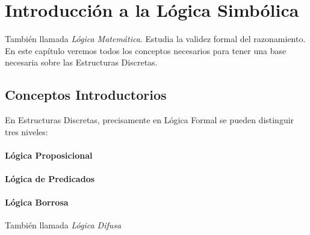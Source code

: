 \chapter{Introducción a la Lógica Simbólica}
También llamada \textit{Lógica Matemática}. Estudia la validez formal del razonamiento. En este capítulo veremos todos los conceptos necesarios para tener una base necesaria sobre las Estructuras Discretas.
\section{Conceptos Introductorios}
En Estructuras Discretas, precisamente en Lógica Formal se pueden distinguir tres niveles:
\subsubsection{Lógica Proposicional}
\subsubsection{Lógica de Predicados}
\subsubsection{Lógica Borrosa}
También llamada \textit{Lógica Difusa}